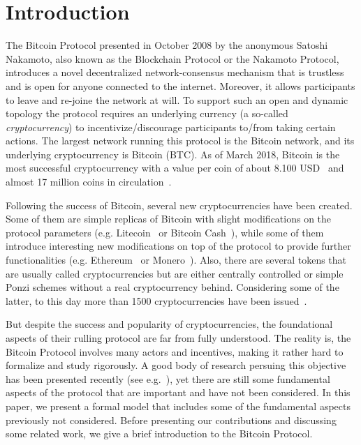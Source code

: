 \section{Introduction}

The Bitcoin Protocol \cite{Bitcoin} presented in October 2008 by the anonymous Satoshi Nakamoto, also known as the Blockchain Protocol or the Nakamoto Protocol, introduces a novel decentralized network-consensus mechanism that is trustless and is open for anyone connected to the internet. Moreover, it allows participants to leave and re-joine the network at will. To support such an open and dynamic topology the protocol requires an underlying currency (a so-called \emph{cryptocurrency}) to incentivize/discourage participants to/from taking certain actions. The largest network running this protocol is the Bitcoin network, and its underlying cryptocurrency is Bitcoin (BTC). As of March 2018, Bitcoin is the most successful cryptocurrency with a value per coin of about 8.100 USD~\cite{BitcoinPrice} and almost 17 million coins in circulation~\cite{Totalcoins}.
 
Following the success of Bitcoin, several new cryptocurrencies have been created. Some of them are simple replicas of Bitcoin with slight modifications on the protocol parameters (e.g. Litecoin~\cite{Litecoin} or Bitcoin Cash~\cite{Bcash}), while some of them introduce interesting new modifications on top of the protocol to provide further functionalities (e.g. Ethereum~\cite{Ethereum} or Monero~\cite{Monero}). Also, there are several tokens that are usually called cryptocurrencies but are either centrally controlled or simple Ponzi schemes without a real cryptocurrency behind. Considering some of the latter, to this day more than 1500 cryptocurrencies have been issued~\cite{coinmarketcap}.

But despite the success and popularity of cryptocurrencies, the foundational aspects of their rulling protocol are far from fully understood. The reality is, the Bitcoin Protocol involves many actors and incentives, making it rather hard to formalize and study rigorously. A good body of research persuing this objective has been presented recently (see e.g.~\cite{mininggames:2016,optimalselfishmining2017,instabilitywithoutreward:2016}), yet there are still some fundamental aspects of the protocol that are important and have not been considered. In this paper, we present a formal model that includes some of the fundamental aspects previously not considered. Before presenting our contributions and discussing some related work, we give a brief introduction to the Bitcoin Protocol.

